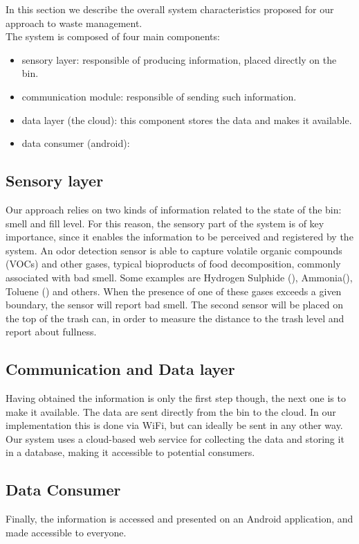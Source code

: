 
In this section we describe the overall system characteristics proposed for our approach to waste management.\\
The system is composed of four main components:
\begin{itemize}
\item sensory layer: responsible of producing information, placed directly on the bin.
\item communication module: responsible of sending such information.
\item data layer (the cloud): this component stores the data and makes it available.
\item data consumer (android):  
\end{itemize}

\subsection{Sensory layer}
Our approach relies on two kinds of information related to the state of the bin: smell and fill level.
For this reason, the sensory part of the system is of key importance, since it enables the information to be perceived and registered by the system.
An odor detection sensor is able to capture volatile organic compounds (VOCs) and other gases, typical bioproducts of food decomposition, commonly associated with bad smell. 
Some examples are Hydrogen Sulphide (), Ammonia(), Toluene () and others.
When the presence of one of these gases exceeds a given boundary, the sensor will report bad smell.
The second sensor will be placed on the top of the trash can, in order to measure the distance to the trash level and report about fullness.

\subsection{Communication and Data layer}
Having obtained the information is only the first step though, the next one is to make it available.
The data are sent directly from the bin to the cloud. In our implementation this is done via WiFi, but can ideally be sent in any other way.
Our system uses a cloud-based web service for collecting the data and storing it in a database, making it accessible to potential consumers.

\subsection{Data Consumer}
Finally, the information is accessed and presented on an Android application, and made accessible to everyone. 